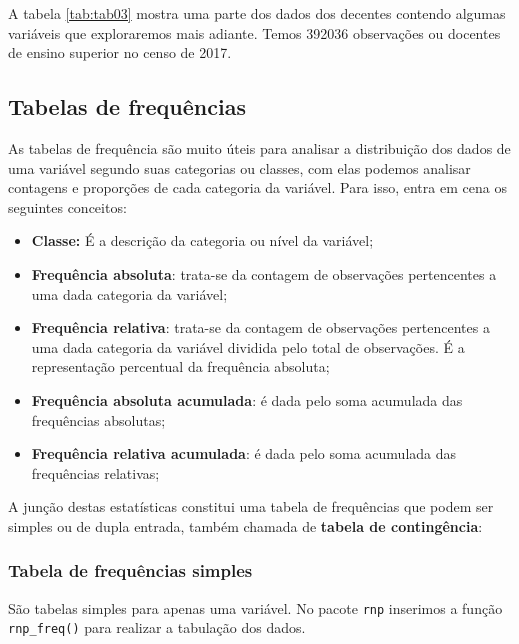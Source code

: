 \documentclass[11pt,]{style/krantz}
\providecommand{\tightlist}{%
  \setlength{\itemsep}{0pt}\setlength{\parskip}{0pt}}
\theoremstyle{definition}
\theoremstyle{definition}
\theoremstyle{definition}
\theoremstyle{remark}
\begin{document}
A tabela \ref{tab:tab03} mostra uma parte dos dados dos decentes contendo algumas variáveis que exploraremos mais adiante. Temos 392036 observações ou docentes de ensino superior no censo de 2017.

\hypertarget{tabelas-de-frequencias}{%
\subsection{Tabelas de frequências}\label{tabelas-de-frequencias}}

As tabelas de frequência são muito úteis para analisar a distribuição dos dados de uma variável segundo suas categorias ou classes, com elas podemos analisar contagens e proporções de cada categoria da variável. Para isso, entra em cena os seguintes conceitos:

\begin{itemize}
\tightlist
\item
  \textbf{Classe:} É a descrição da categoria ou nível da variável;
\item
  \textbf{Frequência absoluta}: trata-se da contagem de observações pertencentes a uma dada categoria da variável;
\item
  \textbf{Frequência relativa}: trata-se da contagem de observações pertencentes a uma dada categoria da variável dividida pelo total de observações. É a representação percentual da frequência absoluta;
\item
  \textbf{Frequência absoluta acumulada}: é dada pelo soma acumulada das frequências absolutas;
\item
  \textbf{Frequência relativa acumulada}: é dada pelo soma acumulada das frequências relativas;
\end{itemize}

A junção destas estatísticas constitui uma tabela de frequências que podem ser simples ou de dupla entrada, também chamada de \textbf{tabela de contingência}:

\hypertarget{tabela-de-frequencias-simples}{%
\subsubsection{Tabela de frequências simples}\label{tabela-de-frequencias-simples}}

São tabelas simples para apenas uma variável. No pacote \texttt{rnp} inserimos a função \texttt{rnp\_freq()} para realizar a tabulação dos dados.
\end{document}
